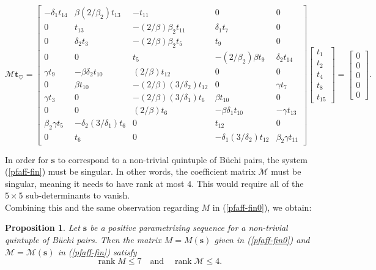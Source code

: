 \documentclass[letterpaper,10pt]{amsart}
\newcommand{\Bs}{{\mathbf{s}}}
\newcommand{\Bt}{{\mathbf{t}}}
\newcommand{\M}{{\mathcal{M}}}
\newcommand{\rank}{\operatorname{rank}}
\newtheorem{proposition}[theorem]{Proposition}
\theoremstyle{definition}
\numberwithin{equation}{section}
\begin{document}
\begin{equation} \label{pfaff-fin} 
\M \Bt_\heartsuit = 
\begin{bmatrix} -\delta_1 t_{14}  & \beta (2/\beta_2) t_{13}  & -t_{11}  & 0 & 0 \\
0 & t_{13}  & - (2/\beta) \beta_2 t_{11}  & \delta_1 t_7  & 0 \\
0 & \delta_2 t_3  & -(2/\beta) \beta_2 t_5  &  t_9  & 0 \\
0 & 0 & t_5  & - (2/\beta_2) \beta t_9  &  \delta_2 t_{14}  \\
\gamma t_9  & - \beta \delta_2 t_{10}  & (2/\beta) t_{12}  & 0 & 0 \\
0 & \beta t_{10}  & - (2/\beta) (3/\delta_2) t_{12}  & 0 &  \gamma t_7  \\
 \gamma t_3   & 0 & -(2/\beta) (3/\delta_1) t_6  &  \beta t_{10} & 0 \\
0 & 0 & (2/\beta) t_6  & - \beta\delta_1 t_{10} & -  \gamma t_{13}  \\
\beta_2 \gamma t_5  & -\delta_2 (3/\delta_1) t_6  & 0 &  t_{12}  & 0 \\
0 & t_6  & 0 & - \delta_1 (3/\delta_2) t_{12}  & \beta_2 \gamma t_{11}  
\end{bmatrix} \begin{bmatrix} t_1  \\ t_2  \\ t_4  \\ t_8  \\ t_{15}  
\end{bmatrix} = \begin{bmatrix} 0 \\ 0 \\ 0 \\ 0 \\ 0 \end{bmatrix}.
\end{equation}

In order for $\Bs$ to correspond to a non-trivial quintuple of B\"{u}chi pairs, the system (\ref{pfaff-fin}) must be singular. In other words, the coefficient matrix $\M$ must be singular, meaning it needs to have rank at most $4$. This would require all of the $5 \times 5$ sub-determinants to vanish. \\

Combining this and the same observation regarding $M$ in (\ref{pfaff-fin0}), we obtain:

\begin{proposition} \label{rankbd}  Let $\Bs$ be a positive parametrizing sequence for a non-trivial quintuple of B\"{u}chi pairs. Then the matrix $M = M(\Bs)$ given in (\ref{pfaff-fin0}) and $\M = \M(\Bs)$ in (\ref{pfaff-fin}) satisfy 
\begin{equation} \rank M \leq 7 \quad \text{and} \quad \rank \M \leq 4.
\end{equation}
\end{proposition}
\end{document}
